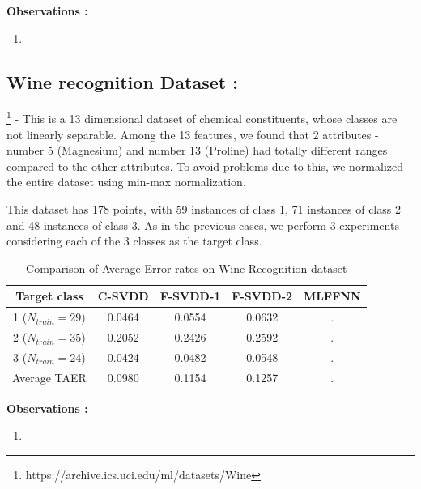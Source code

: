 \documentclass{article} %
\begin{document}
\textbf{Observations :}
\begin{enumerate}
\item 
\end{enumerate}





\subsection{Wine recognition Dataset :}\footnote{https://archive.ics.uci.edu/ml/datasets/Wine}  - This is a 13 dimensional dataset of chemical constituents, whose classes are not linearly separable. Among the 13 features, we found that 2 attributes - number 5 (Magnesium)  and number 13 (Proline) had totally different ranges compared to the other attributes. To avoid problems due to this, we normalized the entire dataset using min-max normalization. 

This dataset has 178 points, with 59 instances of class 1, 71 instances of class 2 and 48 instances of class 3.
As in the previous cases, we perform 3 experiments considering each of the 3 classes as the target class.



\begin{table}[H]
\begin{center}
\caption{Comparison of Average Error rates on Wine Recognition dataset}
\begin{tabular}{|c|c|c|c|c|}
\hline
Target class & C-SVDD & F-SVDD-1 & F-SVDD-2 & MLFFNN \\ \hline
1 ($N_{train} = 29$) & 0.0464   & 0.0554  & 0.0632   &. \\ \hline
2 ($N_{train} = 35$) &  0.2052  &  0.2426   & 0.2592   &. \\ \hline
3 ($N_{train} = 24$) & 0.0424   &  0.0482  &  0.0548 &. \\ \hline
Average TAER &  0.0980 & 0.1154 & 0.1257 &. \\ \hline

\end{tabular}
\end{center}
\end{table}


\textbf{Observations :}
\begin{enumerate}
\item 
\end{enumerate}
\end{document}
